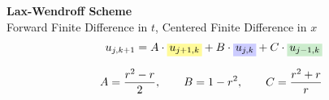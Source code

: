 \documentclass[
	final,
	a4paper,
	oneside,
	parskip=full,
	headings=standardclasses,
	headings=big,
	pointednumbers,
    fleqn
]{scrartcl}
\newcommand{\tfillb}[1]{\tfillc[#1][blue!20]}
\newcommand{\tfillg}[1]{\tfillc[#1][Green!20]}
\newcommand{\tfilly}[1]{\tfillc[#1][yellow!40]}
\newcommand{\f}[2]{\frac{#1}{#2}}
\begin{document}
    {\bf{Lax-Wendroff Scheme}} \\
    Forward Finite Difference in $t$, Centered Finite Difference in $x$ \\
    {\setlength{\abovedisplayskip}{-6pt}
    \setlength{\belowdisplayskip}{-12pt}
    \begin{align*}
        u_{j,k+1} = A \cdot \tfilly{$u_{j+1,k}$} + B \cdot \tfillb{$u_{j,k}$} + C \cdot \tfillg{$u_{j-1,k}$} \\[0.25cm]
        A = \f{r^2 - r}{2}, \qquad B = 1 - r^2, \qquad C = \f{r^2 + r}{r}
    \end{align*}}
    

    
\end{document}
